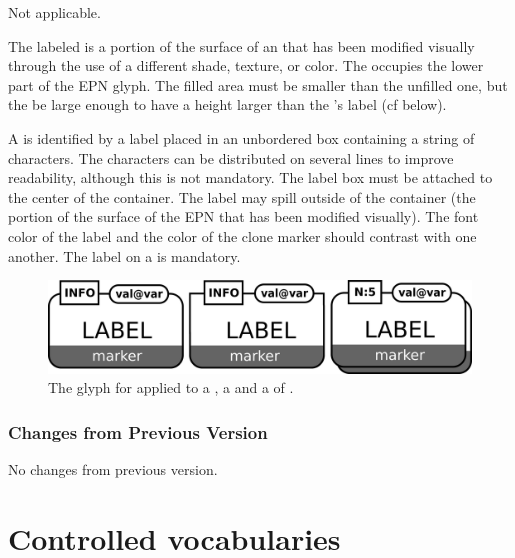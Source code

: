 \begin{glyphDescription}

\glyphSboTerm Not applicable.

\glyphContainer The labeled  is a portion of the surface of an  that has been modified visually through the use of a different shade, texture, or color.  The  occupies the lower part of the EPN glyph. The filled area must be smaller than the unfilled one, but the be large enough to have a height larger than the 's label (cf below).

\glyphLabel A  is identified by a label placed in an unbordered box containing a string of characters.  The characters can be distributed on several lines to improve readability, although this is not mandatory.  The label box must be attached to the center of the container.  The label may spill outside of the container (the portion of the surface of the EPN that has been modified visually).  The font color of the label and the color of the clone marker should contrast with one another.  The label on a  is mandatory.

\end{glyphDescription}

\begin{figure}[htb]
  \centering
  \includegraphics[scale = 0.3]{images/labeledCloneMarker}
  \caption{The \PD glyph for  applied to a , a  and a  of .}
  \label{fig:techref:labeledCloneMarker}
\end{figure}

\subsubsection{Changes from Previous Version}

No changes from previous version.

\section{Controlled vocabularies}\label{sec:techref:CVs}

